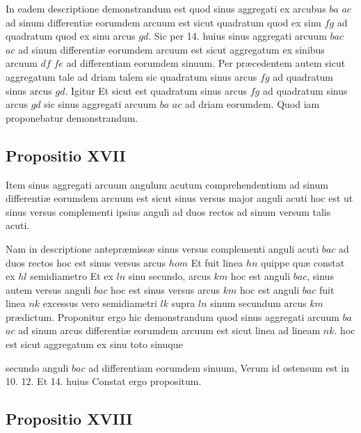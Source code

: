 \documentclass[11pt,a4paper]{article}
\begin{document}
In eadem descriptione demonstrandum est quod sinus aggregati ex arcubus $ba$ $ac$ ad sinum differentiæ eorumdem arcuum est sicut quadratum quod ex sinu $fg$ ad quadratum quod ex sinu arcus $gd$. Sic per 14. huius sinus aggregati arcuum $bac$ $ac$ ad sinum differentiæ eorumdem arcuum est sicut aggregatum ex sinibus arcuum $df$ $fe$ ad differentiam eorumdem sinuum. Per præcedentem autem sicut aggregatum tale ad driam talem sic quadratum sinus arcus $fg$ ad quadratum sinus arcus $gd$. Igitur Et sicut est quadratum sinus arcus $fg$ ad quadratum sinus arcus $gd$ sic sinus aggregati arcuum $ba$ $ac$ ad driam eorumdem. Quod iam proponebatur demonstrandum.

\subsection*{Propositio XVII}

Item sinus aggregati arcuum angulum acutum comprehendentium ad sinum differentiæ eorumdem arcuum est sicut sinus versus major anguli acuti hoc est ut sinus versus complementi ipsius anguli ad duos rectos ad sinum versum talis acuti.

Nam in descriptione antepræmissæ sinus versus complementi anguli acuti $bac$ ad duos rectos hoc est sinus versus arcus $hom$ Et fuit linea $hn$ quippe quæ constat ex $hl$ semidiametro Et ex $ln$ sinu secundo, arcus $km$ hoc est anguli $bac$, sinus autem versus anguli $bac$ hoc est sinus versus arcus $km$ hoc est anguli $bac$ fuit linea $nk$ excessus vero semidiametri $lk$ supra  $ln$ sinum secundum arcus $km$ prædictum. Proponitur ergo hic demonstrandum quod sinus aggregati arcuum $ba$ $ac$ ad sinum arcus differentiæ eorumdem arcuum est sicut linea  ad lineam $nk$. hoc est sicut aggregatum ex sinu toto sinuque

secundo anguli $bac$ ad differentiam eorumdem sinuum, Verum id ostensum est in 10. 12. Et 14. huius Constat ergo propositum.

\subsection*{Propositio XVIII}
\end{document}
